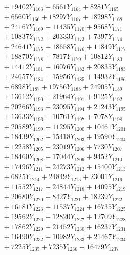 \documentclass[a4paper,10pt]{article}
\begin{document}
{\begin{align}
&\;  + 19402 Y_{1163} + 6561 Y_{1164} + 8281 Y_{1165} \\[0.3ex]
&\;  + 6560 Y_{1166} + 18297 Y_{1167} + 18298 Y_{1168} \\[0.5ex]\allowbreak
&\;  + 24167 Y_{1169} + 11435 Y_{1170} + 9568 Y_{1171} \\[0.3ex]
&\;  + 10837 Y_{1172} + 20333 Y_{1173} + 7397 Y_{1174} \\[0.3ex]
&\;  + 24641 Y_{1175} + 18658 Y_{1176} + 11849 Y_{1177} \\[0.3ex]
&\;  + 18870 Y_{1178} + 7817 Y_{1179} + 10812 Y_{1180} \\[0.3ex]
&\;  + 14412 Y_{1181} + 16076 Y_{1182} + 20835 Y_{1183} \\[0.3ex]
&\;  + 24657 Y_{1184} + 15956 Y_{1185} + 14932 Y_{1186} \\[0.3ex]
&\;  + 6898 Y_{1187} + 19756 Y_{1188} + 24905 Y_{1189} \\[0.3ex]
&\;  + 13612 Y_{1190} + 21964 Y_{1191} + 9125 Y_{1192} \\[0.3ex]
&\;  + 20266 Y_{1193} + 23095 Y_{1194} + 21243 Y_{1195} \\[0.3ex]
&\;  + 13633 Y_{1196} + 10761 Y_{1197} + 7078 Y_{1198} \\[0.5ex]\allowbreak
&\;  + 20589 Y_{1199} + 11295 Y_{1200} + 10461 Y_{1201} \\[0.3ex]
&\;  + 18439 Y_{1202} + 15418 Y_{1203} + 19590 Y_{1204} \\[0.3ex]
&\;  + 12258 Y_{1205} + 23019 Y_{1206} + 7730 Y_{1207} \\[0.3ex]
&\;  + 18460 Y_{1208} + 17044 Y_{1209} + 9452 Y_{1210} \\[0.3ex]
&\;  + 17496 Y_{1211} + 24273 Y_{1212} + 15400 Y_{1213} \\[0.3ex]
&\;  + 6825 Y_{1214} + 24849 Y_{1215} + 23001 Y_{1216} \\[0.3ex]
&\;  + 11552 Y_{1217} + 24844 Y_{1218} + 14095 Y_{1219} \\[0.3ex]
&\;  + 20680 Y_{1220} + 8427 Y_{1221} + 18239 Y_{1222} \\[0.3ex]
&\;  + 16181 Y_{1223} + 11537 Y_{1224} + 16735 Y_{1225} \\[0.3ex]
&\;  + 19562 Y_{1226} + 12820 Y_{1227} + 12709 Y_{1228} \\[0.5ex]\allowbreak
&\;  + 17862 Y_{1229} + 21452 Y_{1230} + 16237 Y_{1231} \\[0.3ex]
&\;  + 16490 Y_{1232} + 10982 Y_{1233} + 21467 Y_{1234} \\[0.3ex]
&\;  + 7225 Y_{1235} + 7235 Y_{1236} + 16479 Y_{1237} \\[0.3ex]

\end{align}}
\end{document}
